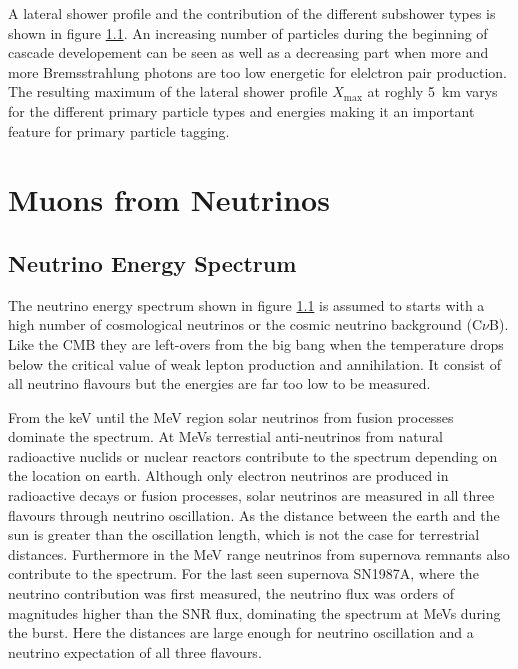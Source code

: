 A lateral shower profile and the contribution of the different subshower types is shown in figure \ref{}.
An increasing number of particles during the beginning of cascade developement can be seen as well as a decreasing part when more and more Bremsstrahlung photons are too low energetic for elelctron pair production.
The resulting maximum of the lateral shower profile $X_{\mathrm{max}}$ at roghly \SI{5}{km} varys for the different primary particle types and energies making it an important feature for primary particle tagging.


\section{Muons from Neutrinos}

\subsection{Neutrino Energy Spectrum}

The neutrino energy spectrum shown in figure \ref{} is assumed to starts with a high number of cosmological neutrinos or the cosmic neutrino background (C$\nu$B).
Like the CMB they are left-overs from the big bang when the temperature drops below the critical value of weak lepton production and annihilation.
It consist of all neutrino flavours but the energies are far too low to be measured.

From the keV until the MeV region solar neutrinos from fusion processes dominate the spectrum.
At MeVs terrestial anti-neutrinos from natural radioactive nuclids or nuclear reactors contribute to the spectrum depending on the location on earth.
Although only electron neutrinos are produced in radioactive decays or fusion processes, solar neutrinos are measured in all three flavours through neutrino oscillation.
As the distance between the earth and the sun is greater than the oscillation length, which is not the case for terrestrial distances.
Furthermore in the MeV range neutrinos from supernova remnants also contribute to the spectrum.
For the last seen supernova SN1987A, where the neutrino contribution was first measured, the neutrino flux was orders of magnitudes higher than the SNR flux, dominating the spectrum at MeVs during the burst.
Here the distances are large enough for neutrino oscillation and a neutrino expectation of all three flavours.

